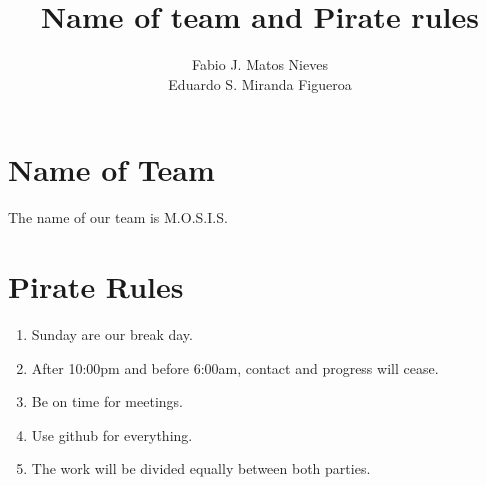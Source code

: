 \documentclass{article}
\author{Fabio J. Matos Nieves \\ Eduardo S. Miranda Figueroa}
\title{Name of team and Pirate rules}
\begin{document}
\maketitle
\section{Name of Team}

The name of our team is M.O.S.I.S.

\section{Pirate Rules}

\begin{enumerate}
    \item Sunday are our break day.
    \item After 10:00pm and before 6:00am, contact and progress will cease.
    \item Be on time for meetings.
    \item Use github for everything.
    \item The work will be divided equally between both parties.
\end{enumerate}
\end{document}
